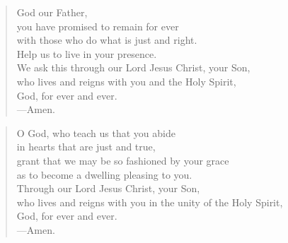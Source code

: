 \prayer

\setlength{\leftmargini}{\prayerleftmargini}

\begin{verse}
God our Father,\\
you have promised to remain for ever\\
with those who do what is just and right.\\
Help us to live in your presence.\\
We ask this through our Lord Jesus Christ, your Son,\\
who lives and reigns with you and the Holy Spirit,\\
God, for ever and ever.\\
{\color{red}---\thinspace}Amen.
\end{verse}


\begin{verse}
O God, who teach us that you abide\\
in hearts that are just and true,\\
grant that we may be so fashioned by your grace\\
as to become a dwelling pleasing to you.\\
Through our Lord Jesus Christ, your Son,\\
who lives and reigns with you in the unity of the Holy Spirit,\\
God, for ever and ever.\\
{\color{red}---\thinspace}Amen.
\end{verse}

\setlength{\leftmargini}{\defleftmargini}